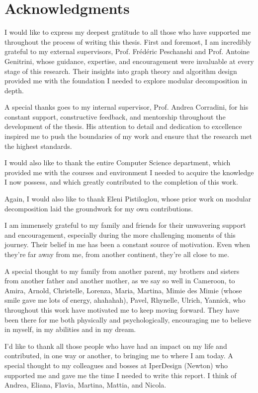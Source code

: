 

\chapter*{Acknowledgments}\label{ch:acknowledgments}

I would like to express my deepest gratitude to all those who have supported me throughout the process of writing this thesis.
First and foremost, I am incredibly grateful to my external supervisors, Prof. Frédéric Peschanshi and Prof. Antoine Genitrini,
whose guidance, expertise, and encouragement were invaluable at every stage of this research.
Their insights into graph theory and algorithm design provided me with the foundation I needed to explore modular decomposition in depth.

A special thanks goes to my internal supervisor, Prof. Andrea Corradini, for his constant support, constructive feedback, and mentorship throughout the development of the thesis.
His attention to detail and dedication to excellence inspired me to push the boundaries of my work and ensure that the research met the highest standards.

I would also like to thank the entire Computer Science department, which provided me with the courses and environment I needed to acquire the knowledge I now possess, and which greatly contributed to the completion of this work.

Again, I would also like to thank Eleni Pistiloglou, whose prior work on modular decomposition laid the groundwork for my own contributions.

I am immensely grateful to my family and friends for their unwavering support and encouragement, especially during the more challenging moments of this journey.
Their belief in me has been a constant source of motivation.
Even when they're far away from me, from another continent, they're all close to me.

A special thought to my family from another parent, my brothers and sisters from another father and another mother, as we say so well in Cameroon,
to Amira, Arnold, Christelle, Lorenza, Maria, Martina, Mimie des Mimie (whose smile gave me lots of energy, ahahahah), Pavel, Rhynelle, Ulrich, Yannick,
who throughout this work have motivated me to keep moving forward.
They have been there for me both physically and psychologically, encouraging me to believe in myself, in my abilities and in my dream.

I'd like to thank all those people who have had an impact on my life and contributed, in one way or another, to bringing me to where I am today.
A special thought to my colleagues and bosses at IperDesign (Newton) who supported me and gave me the time I needed to write this report.
I think of Andrea, Eliana, Flavia, Martina, Mattia, and Nicola.

